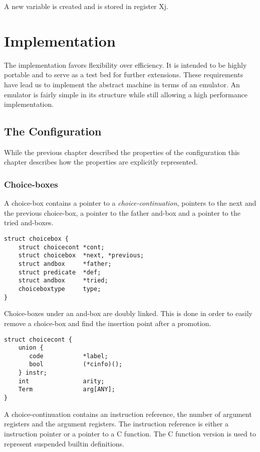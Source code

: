 A new variable is created and is stored in register Xj. 


\chapter{Implementation}\label{ch:impl}


The implementation favors flexibility over efficiency.  It is intended to be
highly portable and to serve as a test bed for further extensions. These
requirements have lead us to implement the abstract machine in terms
of an emulator. An emulator is fairly simple in its structure while still
allowing a high performance implementation.

\section{The Configuration}

While the previous chapter described the properties of the
configuration this chapter describes how the properties are explicitly
represented. 

\subsection*{Choice-boxes}

A choice-box contains a pointer to a {\em choice-continuation},
pointers to the next and the previous choice-box, a pointer to the father
and-box and a pointer to the tried and-boxes. 

\begin{verbatim}
struct choicebox {
    struct choicecont *cont;
    struct choicebox  *next, *previous;
    struct andbox     *father;
    struct predicate  *def;
    struct andbox     *tried;
    choiceboxtype     type;
}
\end{verbatim}

Choice-boxes under an and-box are doubly linked. This is done in order
to easily remove a choice-box and find the insertion point after a
promotion. 

\begin{verbatim}
struct choicecont {
    union {
       code           *label;
       bool           (*cinfo)();
    } instr;
    int               arity;
    Term              arg[ANY];
}
\end{verbatim}

A choice-continuation contains an instruction reference, the number of
argument registers and the argument registers. The instruction
reference is either a instruction pointer or a pointer to a C function.
The C function version is used to represent suspended builtin
definitions.

